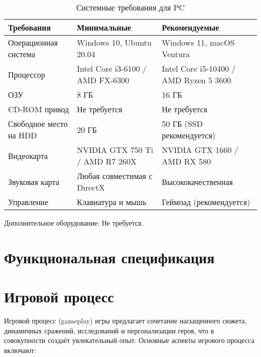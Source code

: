 \documentclass{article}
\begin{document}
\begin{table}[h!]
\centering
\renewcommand{\arraystretch}{1.5}
\begin{tabular}{|l|l|l|}
\hline
\textbf{Требования}           & \textbf{Минимальные}                        & \textbf{Рекомендуемые}                    \\ \hline
Операционная система          & Windows 10, Ubuntu 20.04                    & Windows 11, macOS Ventura                 \\ \hline
Процессор                     & Intel Core i3-6100 / AMD FX-6300            & Intel Core i5-10400 / AMD Ryzen 5 3600    \\ \hline
ОЗУ                           & 8 ГБ                                        & 16 ГБ                                     \\ \hline
CD-ROM привод                 & Не требуется                               & Не требуется                             \\ \hline
Свободное место на HDD        & 20 ГБ                                       & 50 ГБ (SSD рекомендуется)                \\ \hline
Видеокарта                    & NVIDIA GTX 750 Ti / AMD R7 260X             & NVIDIA GTX 1660 / AMD RX 580             \\ \hline
Звуковая карта                & Любая совместимая с DirectX                 & Высококачественная                       \\ \hline
Управление                    & Клавиатура и мышь                           & Геймпад (рекомендуется)                  \\ \hline
\end{tabular}
\caption{Системные требования для PC}
\end{table}

Дополнительное оборудование: Не требуется.

\section{Функциональная спецификация}

\section*{Игровой процесс}

Игровой процесс (gameplay) игры предлагает сочетание насыщенного сюжета, динамичных сражений, исследований и персонализации героя, что в совокупности создаёт увлекательный опыт. Основные аспекты игрового процесса включают:
\end{document}
